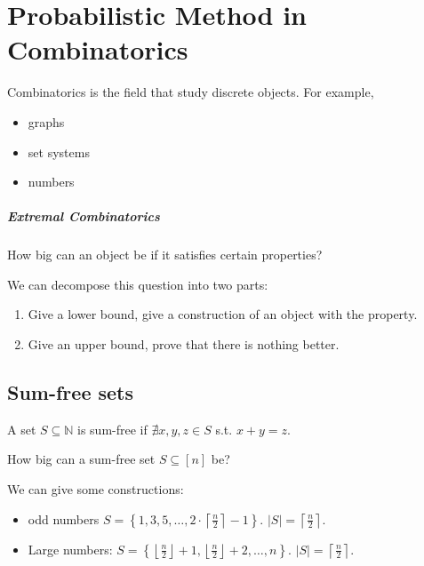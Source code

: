 \chapter{Probabilistic Method in Combinatorics}
Combinatorics is the field that study discrete objects. For example, 
\begin{itemize}
    \item graphs 
    \item set systems 
    \item numbers
\end{itemize}

\paragraph{Extremal Combinatorics}
\begin{question}
    How big can an object be if it satisfies certain properties?
\end{question}

We can decompose this question into two parts:
\begin{enumerate}
    \item Give a lower bound, give a construction of an object with the property. 
    \item Give an upper bound, prove that there is nothing better.
\end{enumerate}

\section{Sum-free sets}
\begin{definition}
    A set \(S \subseteq \mathbb{N} \) is sum-free if \(\nexists x, y, z \in S \) s.t. \(x + y = z\).    
\end{definition}

\begin{question}
    How big can a sum-free set \(S \subseteq [n]\) be?
\end{question}

We can give some constructions:
\begin{itemize}
    \item odd numbers \(S = \left\{ 1, 3, 5, \dots , 2 \cdot \left\lceil \frac{n}{2} \right\rceil - 1 \right\} \). \(\vert S \vert = \left\lceil \frac{n}{2} \right\rceil  \).
    \item Large numbers: \(S = \left\{ \left\lfloor \frac{n}{2} \right\rfloor + 1, \left\lfloor \frac{n}{2} \right\rfloor + 2, \dots , n  \right\} \). \(\vert S \vert = \left\lceil \frac{n}{2} \right\rceil  \).  
\end{itemize}

